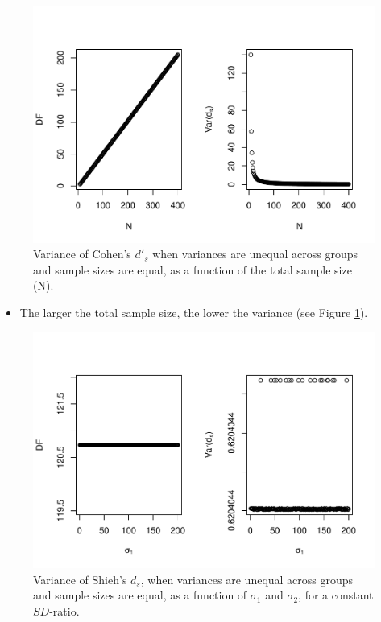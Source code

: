 \documentclass[
  man]{apa6}
\providecommand{\tightlist}{%
  \setlength{\itemsep}{0pt}\setlength{\parskip}{0pt}}
\begin{document}
\begin{figure}
\centering
\includegraphics{Theoretical-Variance-of-all-estimators-as-a-function-of-population-parameters_files/figure-latex/varshiehhetbalNsize2-1.pdf}
\caption{\label{fig:varshiehhetbalNsize2}Variance of Cohen's \(d'_s\) when variances are unequal across groups and sample sizes are equal, as a function of the total sample size (N).}
\end{figure}

\begin{itemize}
\tightlist
\item
  The larger the total sample size, the lower the variance (see Figure \ref{fig:varshiehhetbalNsize2}).
\end{itemize}

\begin{figure}
\centering
\includegraphics{Theoretical-Variance-of-all-estimators-as-a-function-of-population-parameters_files/figure-latex/varshiehhetbalvariance2-1.pdf}
\caption{\label{fig:varshiehhetbalvariance2}Variance of Shieh's \(d_s\), when variances are unequal across groups and sample sizes are equal, as a function of \(\sigma_1\) and \(\sigma_2\), for a constant \(SD\)-ratio.}
\end{figure}
\end{document}
